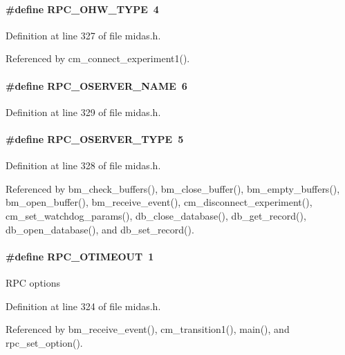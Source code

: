 \paragraph[{RPC\_\-OHW\_\-TYPE}]{\setlength{\rightskip}{0pt plus 5cm}\#define RPC\_\-OHW\_\-TYPE~4}\hfill\label{group__mdefineh_gaf716b122f115aca08e68391343145cb3}


Definition at line 327 of file midas.h.

Referenced by cm\_\-connect\_\-experiment1().
\paragraph[{RPC\_\-OSERVER\_\-NAME}]{\setlength{\rightskip}{0pt plus 5cm}\#define RPC\_\-OSERVER\_\-NAME~6}\hfill\label{group__mdefineh_ga1caa8de36fbdd251b67fd4601d0e708f}


Definition at line 329 of file midas.h.
\paragraph[{RPC\_\-OSERVER\_\-TYPE}]{\setlength{\rightskip}{0pt plus 5cm}\#define RPC\_\-OSERVER\_\-TYPE~5}\hfill\label{group__mdefineh_ga7f6354019d48c7beeb8f5bd5c2fac8bb}


Definition at line 328 of file midas.h.

Referenced by bm\_\-check\_\-buffers(), bm\_\-close\_\-buffer(), bm\_\-empty\_\-buffers(), bm\_\-open\_\-buffer(), bm\_\-receive\_\-event(), cm\_\-disconnect\_\-experiment(), cm\_\-set\_\-watchdog\_\-params(), db\_\-close\_\-database(), db\_\-get\_\-record(), db\_\-open\_\-database(), and db\_\-set\_\-record().
\paragraph[{RPC\_\-OTIMEOUT}]{\setlength{\rightskip}{0pt plus 5cm}\#define RPC\_\-OTIMEOUT~1}\hfill\label{group__mdefineh_ga9d274f0e5944be5b429d6c1bacfe1db0}
RPC options 

Definition at line 324 of file midas.h.

Referenced by bm\_\-receive\_\-event(), cm\_\-transition1(), main(), and rpc\_\-set\_\-option().
